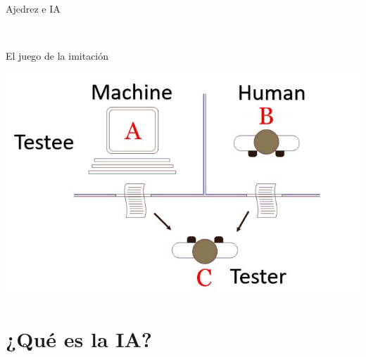 \documentclass[11pt]{beamer}
\begin{document}
\begin{frame}{Ajedrez e IA}
\begin{minipage}{0.5\linewidth}
\


\end{minipage}

\end{frame}


\begin{frame}{El juego de la imitación}

\includegraphics[scale=.5]{imagenes/turing-test.jpg}

\end{frame}


\section{¿Qué es la IA?}
\end{document}
